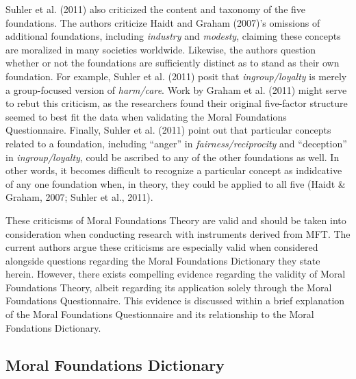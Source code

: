 \documentclass[english,,man]{apa6}
\begin{document}
Suhler et al. (2011) also criticized the content and taxonomy of the five foundations. The authors criticize Haidt and Graham (2007)'s omissions of additional foundations, including \emph{industry} and \emph{modesty}, claiming these concepts are moralized in many societies worldwide. Likewise, the authors question whether or not the foundations are sufficiently distinct as to stand as their own foundation. For example, Suhler et al. (2011) posit that \emph{ingroup/loyalty} is merely a group-focused version of \emph{harm/care}. Work by Graham et al. (2011) might serve to rebut this criticism, as the researchers found their original five-factor structure seemed to best fit the data when validating the Moral Foundations Questionnaire. Finally, Suhler et al. (2011) point out that particular concepts related to a foundation, including \enquote{anger} in \emph{fairness/reciprocity} and \enquote{deception} in \emph{ingroup/loyalty}, could be ascribed to any of the other foundations as well. In other words, it becomes difficult to recognize a particular concept as indidcative of any one foundation when, in theory, they could be applied to all five (Haidt \& Graham, 2007; Suhler et al., 2011).

These criticisms of Moral Foundations Theory are valid and should be taken into consideration when conducting research with instruments derived from MFT. The current authors argue these criticisms are especially valid when considered alongside questions regarding the Moral Foundations Dictionary they state herein. However, there exists compelling evidence regarding the validity of Moral Foundations Theory, albeit regarding its application solely through the Moral Foundations Questionnaire. This evidence is discussed within a brief explanation of the Moral Foundations Questionnaire and its relationship to the Moral Fondations Dictionary.

\hypertarget{moral-foundations-dictionary}{%
\subsection{Moral Foundations Dictionary}\label{moral-foundations-dictionary}}
\end{document}
